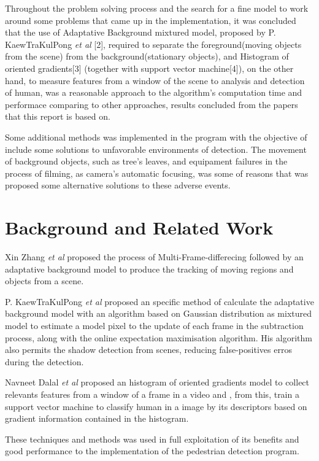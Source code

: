 \documentclass[conference]{IEEEtran}
\begin{document}
	Throughout the problem solving process and the search for a fine model to work around some problems that came up in the implementation, it was concluded that the use of Adaptative Background mixtured model, proposed by P. KaewTraKulPong \textit{et al} [2], required to separate the foreground(moving objects from the scene) from the background(stationary objects), and Histogram of oriented gradients[3] (together with support vector machine[4]), on the other hand, to measure features from a window of the scene to analysis and detection of human, was a reasonable approach to the algorithm's computation time and performace comparing to other approaches, results concluded from the papers that this report is based on. 
	
	Some additional methods was implemented in the program with the objective of include some solutions to unfavorable environments of detection. The movement of background objects, such as tree's leaves, and equipament failures in the process of filming, as camera's automatic focusing, was some of reasons that was proposed some alternative solutions to these adverse events.

\section{Background and Related Work}

	Xin Zhang \textit{et al} proposed the process of Multi-Frame-differecing followed by an adaptative background model to produce the tracking of moving regions and objects from a scene. 
	
	P. KaewTraKulPong \textit{et al} proposed an specific method of calculate the adaptative background model with an algorithm based on Gaussian distribution as mixtured model to estimate a model pixel to the update of each frame in the subtraction process, along with
the online expectation maximisation algorithm. His algorithm also permits the shadow detection from scenes, reducing false-positives erros during the detection.

	Navneet Dalal \textit{et al} proposed an histogram of oriented gradients model to collect relevants features from a window of a frame in a video and , from this, train a support vector machine to classify human in a image by its descriptors based on gradient information contained in the histogram.
	
	These techniques and methods was used in full exploitation of its benefits and good performance to the implementation of the pedestrian detection program. 
\end{document}
